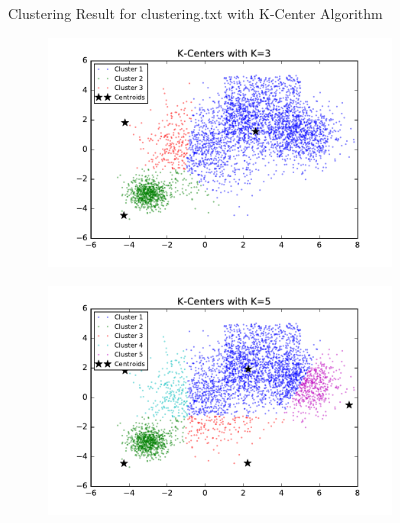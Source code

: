 \begin{description}
\begin{description}
\begin{figure}[!h]
\begin{subfigure}[b]{0.475\textwidth}
        \end{subfigure}      
        \caption{Clustering Result for clustering.txt with K-Center Algorithm}
        \label{fig:kcenter_clustering}
\end{figure}

\begin{figure}[!h]
        \centering
        \begin{subfigure}[b]{0.475\textwidth}
            \centering
            \includegraphics[width=\textwidth]{./figures/bigClustering_kCenter_3.pdf}
        \end{subfigure}
        \hfill      
        \begin{subfigure}[b]{0.475\textwidth}  
            \centering 
            \includegraphics[width=\textwidth]{./figures/bigClustering_kCenter_5.pdf}
        \end{subfigure}  

\end{figure}
\end{description}
\end{description}
